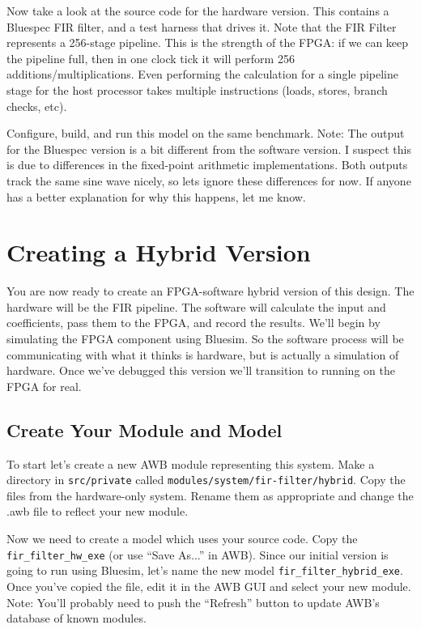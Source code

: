 \documentclass{article}
\begin{document}
Now take a look at the source code for the hardware version. This contains a Bluespec FIR filter, and a test harness that drives it. Note that the FIR Filter
represents a 256-stage pipeline. This is the strength of the FPGA: if we can keep the pipeline full, then in one clock tick it will perform 256
additions/multiplications. Even performing the calculation for a single pipeline stage for the host processor takes multiple instructions (loads, stores, branch
checks, etc).

Configure, build, and run this model on the same benchmark. Note: The output for the Bluespec version is a bit different from the software version. I suspect this
is due to differences in the fixed-point arithmetic implementations. Both outputs track the same sine wave nicely, so lets ignore these differences for now. If
anyone has a better explanation for why this happens, let me know.

\section{Creating a Hybrid Version}

You are now ready to create an FPGA-software hybrid version of this design. The hardware will be the FIR pipeline. The software will
calculate the input and coefficients, pass them to the FPGA, and record the results. We'll begin by simulating the FPGA component
using Bluesim. So the software process will be communicating with what it thinks is hardware, but is actually a simulation of
hardware. Once we've debugged this version we'll transition to running on the FPGA for real.

\subsection{Create Your Module and Model}

To start let's create a new AWB module representing this system. Make a directory in \texttt{src/private} called
\texttt{modules/system/fir-filter/hybrid}. Copy the files from the hardware-only system. Rename them as appropriate and change the
.awb file to reflect your new module.

Now we need to create a model which uses your source code. Copy the \texttt{fir\_filter\_hw\_exe} (or use ``Save As...'' in AWB). Since our initial version is
going to run using Bluesim, let's name the new model \texttt{fir\_filter\_hybrid\_exe}. Once you've copied the file, edit it in the AWB GUI and select your new
module. Note: You'll probably need to push the ``Refresh'' button to update AWB's database of known modules.
\end{document}
